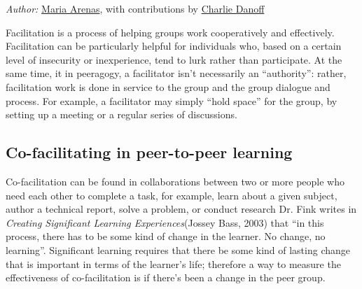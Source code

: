 \emph{Author:}
\href{http://peeragogy.org/resources/meet-the-team/}{Maria Arenas}, with
contributions by
\href{http://peeragogy.org/resources/meet-the-team/}{Charlie Danoff}

Facilitation is a process of helping groups work cooperatively and
effectively. Facilitation can be particularly helpful for individuals
who, based on a certain level of insecurity or inexperience, tend to
lurk rather than participate. At the same time, it in peeragogy, a
facilitator isn't necessarily an ``authority'': rather, facilitation
work is done in service to the group and the group dialogue and process.
For example, a facilitator may simply ``hold space'' for the group, by
setting up a meeting or a regular series of discussions.

\subsection{}

\subsection{Co-facilitating in peer-to-peer learning}

Co-facilitation can be found in collaborations between two or more
people who need each other to complete a task, for example, learn about
a given subject, author a technical report, solve a problem, or conduct
research Dr. Fink writes in \emph{Creating Significant Learning
Experiences}(Jossey Bass, 2003) that ``in this process, there has to be
some kind of change in the learner. No change, no learning''.
Significant learning requires that there be some kind of lasting change
that is important in terms of the learner's life; therefore a way to
measure the effectiveness of co-facilitation is if there's been a change
in the peer group.

